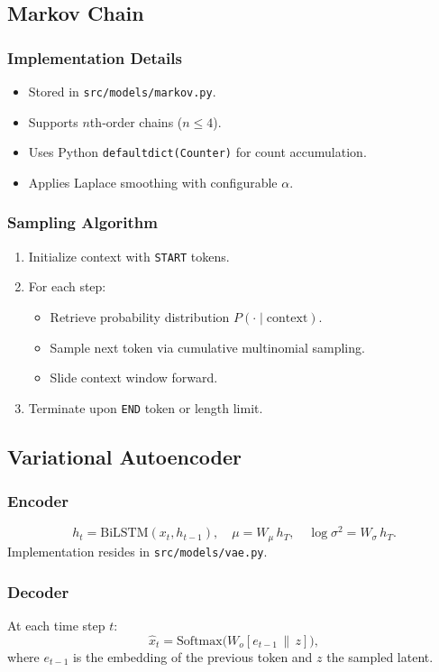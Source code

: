 \subsection{Markov Chain}
\subsubsection{Implementation Details}
\begin{itemize}
  \item Stored in \texttt{src/models/markov.py}.
  \item Supports $n$th‐order chains ($n\le4$).
  \item Uses Python \texttt{defaultdict(Counter)} for count accumulation.
  \item Applies Laplace smoothing with configurable $\alpha$.
\end{itemize}

\subsubsection{Sampling Algorithm}
\begin{enumerate}
  \item Initialize context with \texttt{START} tokens.
  \item For each step:
    \begin{itemize}
      \item Retrieve probability distribution $P(\cdot\mid\mathrm{context})$.
      \item Sample next token via cumulative multinomial sampling.
      \item Slide context window forward.
    \end{itemize}
  \item Terminate upon \texttt{END} token or length limit.
\end{enumerate}

\subsection{Variational Autoencoder}
\subsubsection{Encoder}
\[
  h_t = \mathrm{BiLSTM}(x_t, h_{t-1}),\quad
  \mu = W_\mu \, h_{T},\quad
  \log\sigma^2 = W_\sigma \, h_{T}.
\]
Implementation resides in \texttt{src/models/vae.py}.

\subsubsection{Decoder}
At each time step $t$:
\[
  \hat{x}_t = \mathrm{Softmax}\bigl(W_o [e_{t-1} \,\|\, z]\bigr),
\]
where $e_{t-1}$ is the embedding of the previous token and $z$ the sampled latent.

